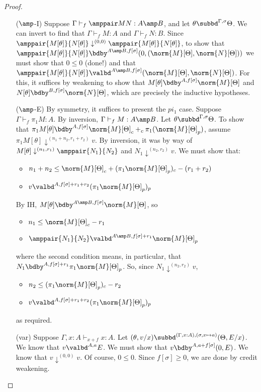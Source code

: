 \begin{proof}
\begin{itemize}
\item[($\amp$-I)] Suppose $\Gamma \vdash_f \amppair M N : A \amp B$, and let $\theta \subbd^{\Gamma,\sigma} \Theta$. We can invert to find that $\Gamma \vdash_f M : A$ and $\Gamma \vdash_f N : B$. Since $\amppair {M[\theta]} {N[\theta]} \downarrow^{(0,0)} \amppair  {M[\theta]} {N[\theta]} $, to show that $\amppair  {M[\theta]} {N[\theta]}  \bdby^{A \amp B,f[\sigma]} (0,(\norm{M}[\Theta],\norm{N}[\Theta]))$ we must show that $0\leq 0$ (done!) and that $\amppair {M[\theta]} {N[\theta]}  \valbd^{A \amp B,f[\sigma]} (\norm{M}[\Theta],\norm{N}[\Theta])$. For this, it suffices by weakening to show that $M[\theta] \bdby^{A,f[\sigma]} \norm{M}[\Theta]$ and $N[\theta] \bdby^{B,f[\sigma]} \norm{N}[\Theta]$, which are precisely the inductive hypotheses.

\item[($\amp$-E)] By symmetry, it suffices to present the $pi_1$ case. Suppose $\Gamma \vdash_f \pi_1 M : A$. By inversion, $\Gamma \vdash_f M : A \amp B$. Let $\theta \subbd^{\Gamma,\sigma} \Theta$. To show that $\pi_1 M[\theta] \bdby^{A,f[\sigma]} \norm{M}[\Theta]_c +_c \pi_1(\norm{M}[\Theta]_p)$, assume $\pi_1 M[\theta] \downarrow^{(n_1+n_2,r_1+r_2)} v$. By inversion, it was by way of $M[\theta] \downarrow^{(n_1,r_1)} \amppair {N_1} {N_2}$ and $N_1 \downarrow^{(n_2,r_2)} v$. We must show that:
\begin{itemize}
   \item $n_1 + n_2 \leq \norm{M}[\Theta]_c + (\pi_1\norm{M}[\Theta]_p)_c - (r_1 + r_2)$
   \item $v \valbd^{A,f[\sigma] + r_1 + r_2} (\pi_1\norm{M}[\Theta]_p)_p$
\end{itemize}
By IH, $M[\theta] \bdby^{A \amp B,f[\sigma]} \norm{M}[\Theta]$, so
\begin{itemize}
  \item $n_1 \leq \norm{M}[\Theta]_c - r_1$
  \item $\amppair {N_1} {N_2} \valbd^{A \amp B,f[\sigma] + r_1} \norm{M}[\Theta]_p$
\end{itemize}
where the second condition means, in particular, that $N_1 \bdby^{A,f[\sigma] + r_1} \pi_1 \norm{M}[\Theta]_p$. So, since $N_1 \downarrow^{(n_2,r_2)} v$,
\begin{itemize}
  \item $n_2 \leq (\pi_1 \norm{M}[\Theta]_p)_c - r_2$
  \item $v \valbd^{A,f[\sigma] + r_1 + r_2} (\pi_1 \norm{M}[\Theta]_p)_p$
\end{itemize}
as required.

\item[(var)] Suppose $\Gamma, x : A \vdash_{x+f} x : A$. Let $(\theta,v/x) \subbd^{(\Gamma,x:A),(\sigma,x\mapsto a)}(\Theta,E/x)$. We know that $v \valbd^{A,a} E$.
We must show that $v \bdby^{A,a+f[\sigma]} (0,E)$. We know that $v \downarrow^{(0,0)} v$. Of course, $0 \leq 0$. Since $f[\sigma] \geq 0$, we are done by credit weakening.

\end{itemize}
\end{proof}
